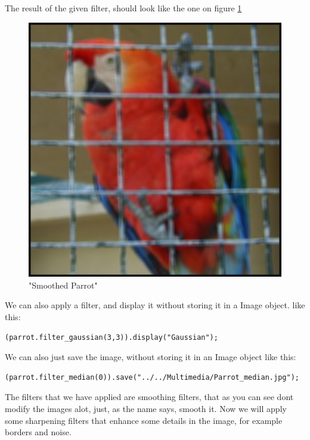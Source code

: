 \documentclass[a4paper]{article}
\begin{document}
The result of the given filter, should look like the one on figure \ref{smoothed}

\begin{figure}

\centering
\includegraphics[scale=0.5]{./.Multimedia/smoothed_parrot.jpg}

\caption{"Smoothed Parrot"}
\label{smoothed}

\end{figure}


We can also apply a filter, and display it without storing it in a Image object. like this:
	
\begin{lstlisting}
(parrot.filter_gaussian(3,3)).display("Gaussian");
\end{lstlisting}

We can also just save the image, without storing it in an Image object like this:

\begin{lstlisting}
(parrot.filter_median(0)).save("../../Multimedia/Parrot_median.jpg");
\end{lstlisting}


The filters that we have applied are smoothing filters, that as you can see dont modify  the images alot, just, as the name says, smooth it.  Now we will apply some sharpening filters that enhance some details in the image, for example borders and noise.
\end{document}
